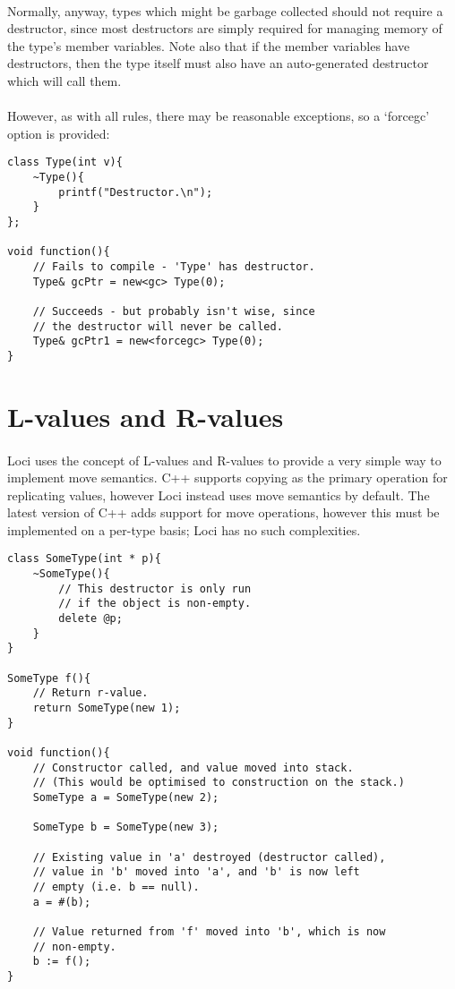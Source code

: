 \documentclass[12pt,twoside,notitlepage]{report}
\begin{document}
\paragraph{}
Normally, anyway, types which might be garbage collected should not require a destructor, since most destructors are simply required for managing memory of the type's member variables. Note also that if the member variables have destructors, then the type itself must also have an auto-generated destructor which will call them.

\paragraph{}
However, as with all rules, there may be reasonable exceptions, so a `forcegc' option is provided:

\small{
\begin{verbatim}
class Type(int v){
    ~Type(){
        printf("Destructor.\n");
    }
};

void function(){
    // Fails to compile - 'Type' has destructor.
    Type& gcPtr = new<gc> Type(0);
    
    // Succeeds - but probably isn't wise, since 
    // the destructor will never be called.
    Type& gcPtr1 = new<forcegc> Type(0);
}
\end{verbatim}
}

\section{L-values and R-values}

\paragraph{}
Loci uses the concept of L-values and R-values to provide a very simple way to implement move semantics. C++ supports copying as the primary operation for replicating values, however Loci instead uses move semantics by default. The latest version of C++ adds support for move operations, however this must be implemented on a per-type basis; Loci has no such complexities.

\small{
\begin{verbatim}
class SomeType(int * p){
    ~SomeType(){
        // This destructor is only run
        // if the object is non-empty.
        delete @p;
    }
}

SomeType f(){
    // Return r-value.
    return SomeType(new 1);
}

void function(){
    // Constructor called, and value moved into stack.
    // (This would be optimised to construction on the stack.)
    SomeType a = SomeType(new 2);
    
    SomeType b = SomeType(new 3);
    
    // Existing value in 'a' destroyed (destructor called),
    // value in 'b' moved into 'a', and 'b' is now left
    // empty (i.e. b == null).
    a = #(b);
    
    // Value returned from 'f' moved into 'b', which is now
    // non-empty.
    b := f();
}
\end{verbatim}
}
\end{document}
